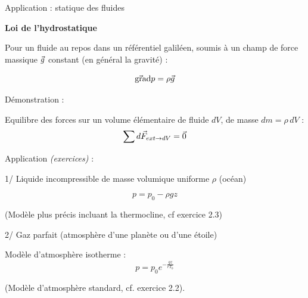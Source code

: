 \begin{frame}{Application : statique des fluides}

\small
\textbf{Loi de l'hydrostatique} \medskip

Pour un fluide au repos dans un référentiel galiléen, soumis à un champ de force massique $\vec{g}$ constant (en général la gravité) :

$$
	\vec{\mbox{\rm gra}}\mbox{\rm d} p = \rho \vec{g}
$$

\pause 
Démonstration :

Equilibre des forces sur un volume élémentaire de fluide $dV$, de masse $dm = \rho\, dV$ :
$$
\sum d\vec{F}_{ext \rightarrow dV} = \vec{0}
$$


\bigskip
\pause

Application \textcolor{vert}{\sl (exercices)} : 

\smallskip

1/ Liquide incompressible de masse volumique uniforme $\rho$ (océan) 

$$
 p = p_0 - \rho g z
$$

(Modèle plus précis incluant la thermocline, cf exercice 2.3)



\bigskip

2/ Gaz parfait (atmosphère d'une planète ou d'une étoile)

Modèle d'atmosphère isotherme :
$$ 
p = p_0 e^{-\frac{ g z}{rT_0}}
$$




(Modèle d'atmosphère standard, cf. exercice 2.2).

\end{frame}




